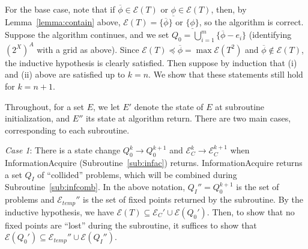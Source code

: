 \documentclass[11pt,reqno]{amsart}
\theoremstyle{definition}
\numberwithin{equation}{section}
\newcommand{\ol}{\overline}
\newcommand{\ul}{\underline}
\newcommand{\pre}{\phi}
\newcommand{\prealloc}{(2^X)^A}
\newcommand{\sub}{\subseteq}
\newcommand{\fix}{\mathcal{E}}
\newcommand{\peq}{\preceq}
\newcommand{\toppre}{\ol{\pre}}
\newcommand{\acto}{Q_0}
\newcommand{\actok}{Q_0^k}
\newcommand{\actc}{Q_I}
\newcommand{\fixfind}{\mathcal{E}_C}
\newcommand{\fixfindk}{\mathcal{E}^k_C}
\newcommand{\fixfindkk}{\mathcal{E}^{k + 1}_C}
\newcommand{\fixtemp}{\mathcal{E}_{temp}}
\begin{document}
For the base case, note that if $\toppre \in \fix(T)$ or $\ul{\pre} \in \fix(T)$, then, by Lemma~\ref{lemma:contain} above, $\fix(T) = \{\toppre\}$ or $\{\ul{\pre}\}$, so the algorithm is correct. 
Suppose the algorithm continues, and we set $\acto = \bigcup_{i = 1}^m \{\toppre - e_i\}$ (identifying $\prealloc$ with a grid as above).
Since $\fix(T) \peq \toppre = \max \fix(T^2)$ and $\toppre \not \in \fix(T)$, the inductive hypothesis is clearly satisfied. 
Then suppose by induction that (i) and (ii) above are satisfied up to $k = n$.
We show that these statements still hold for $k = n +1$.

Throughout, for a set $E$, we let $E'$ denote the state of $E$ at subroutine initialization, and $E''$ its state at algorithm return.
There are two main cases, corresponding to each subroutine.

\emph{Case 1}: There is a state change $\actok \to \acto^{k +1}$ and $\fixfindk \to \fixfindkk$ when InformationAcquire (Subroutine~\ref{sub:infac}) returns.
InformationAcquire returns a set $\actc$ of ``collided'' problems, which will be combined during Subroutine~\ref{sub:infcomb}.
In the above notation, $\actc'' = \acto^{k+1}$ is the set of problems and $\fixtemp''$ is the set of fixed points returned by the subroutine.
By the inductive hypothesis, we have $\fix(T) \sub \fixfind' \cup \fix(\acto')$.
Then, to show that no fixed points are ``lost'' during the subroutine, it suffices to show that $\fix(\acto') \sub \fixtemp'' \cup \fix(\actc'')$.
\end{document}
